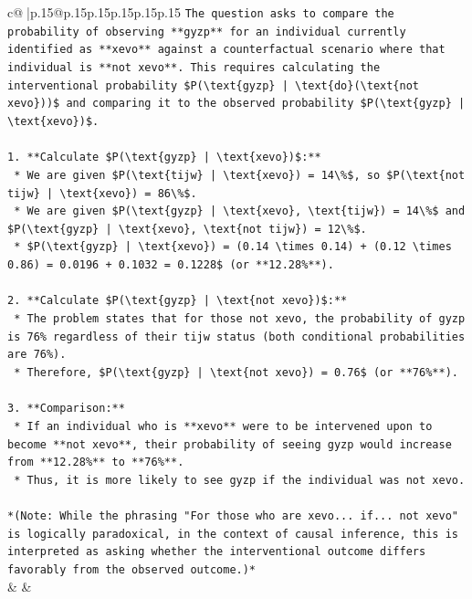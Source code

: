 \documentclass{article}
\begin{document}
{\begin{supertabular}{c@{$\;$}|p{.15\linewidth}@{}p{.15\linewidth}p{.15\linewidth}p{.15\linewidth}p{.15\linewidth}p{.15\linewidth}}
{{{\texttt{The question asks to compare the probability of observing **gyzp** for an individual currently identified as **xevo** against a counterfactual scenario where that individual is **not xevo**. This requires calculating the interventional probability \$P(\textbackslash{}text\{gyzp\} | \textbackslash{}text\{do\}(\textbackslash{}text\{not xevo\}))\$ and comparing it to the observed probability \$P(\textbackslash{}text\{gyzp\} | \textbackslash{}text\{xevo\})\$.} \\
\\ 
\texttt{1.  **Calculate \$P(\textbackslash{}text\{gyzp\} | \textbackslash{}text\{xevo\})\$:**} \\
\texttt{    *   We are given \$P(\textbackslash{}text\{tijw\} | \textbackslash{}text\{xevo\}) = 14\textbackslash{}\%\$, so \$P(\textbackslash{}text\{not tijw\} | \textbackslash{}text\{xevo\}) = 86\textbackslash{}\%\$.} \\
\texttt{    *   We are given \$P(\textbackslash{}text\{gyzp\} | \textbackslash{}text\{xevo\}, \textbackslash{}text\{tijw\}) = 14\textbackslash{}\%\$ and \$P(\textbackslash{}text\{gyzp\} | \textbackslash{}text\{xevo\}, \textbackslash{}text\{not tijw\}) = 12\textbackslash{}\%\$.} \\
\texttt{    *   \$P(\textbackslash{}text\{gyzp\} | \textbackslash{}text\{xevo\}) = (0.14 \textbackslash{}times 0.14) + (0.12 \textbackslash{}times 0.86) = 0.0196 + 0.1032 = 0.1228\$ (or **12.28\%**).} \\
\\ 
\texttt{2.  **Calculate \$P(\textbackslash{}text\{gyzp\} | \textbackslash{}text\{not xevo\})\$:**} \\
\texttt{    *   The problem states that for those not xevo, the probability of gyzp is 76\% regardless of their tijw status (both conditional probabilities are 76\%).} \\
\texttt{    *   Therefore, \$P(\textbackslash{}text\{gyzp\} | \textbackslash{}text\{not xevo\}) = 0.76\$ (or **76\%**).} \\
\\ 
\texttt{3.  **Comparison:**} \\
\texttt{    *   If an individual who is **xevo** were to be intervened upon to become **not xevo**, their probability of seeing gyzp would increase from **12.28\%** to **76\%**.} \\
\texttt{    *   Thus, it is more likely to see gyzp if the individual was not xevo.} \\
\\ 
\texttt{*(Note: While the phrasing "For those who are xevo... if... not xevo" is logically paradoxical, in the context of causal inference, this is interpreted as asking whether the interventional outcome differs favorably from the observed outcome.)*} \\
            }
        }
    }
    & & \\ \\


\end{supertabular}}
\end{document}
